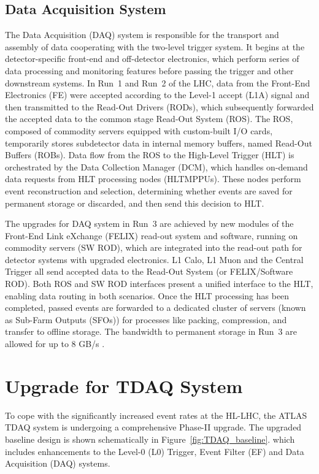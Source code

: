 \subsection{Data Acquisition System}
The Data Acquisition (DAQ) system is responsible for the transport and assembly of data cooperating with the two-level trigger system. It begins at the detector-specific front-end and off-detector electronics, which perform series of data processing and monitoring features before passing the trigger and other downstream systems. In Run~1 and Run~2 of the LHC, data from the Front-End Electronics (FE) were accepted according to the Level-1 accept (L1A) signal and then transmitted to the Read-Out Drivers (RODs), which subsequently forwarded the accepted data to the common stage Read-Out System (ROS). The ROS, composed of commodity servers equipped with custom-built I/O cards, temporarily stores subdetector data in internal memory buffers, named Read-Out Buffers (ROBs). Data flow from the ROS to the High-Level Trigger (HLT) is orchestrated by the Data Collection Manager (DCM), which handles on-demand data requests from HLT processing nodes (HLTMPPUs). These nodes perform event reconstruction and selection, determining whether events are saved for permanent storage or discarded, and then send this decision to HLT. 

The upgrades for DAQ system in Run~3 are achieved by new modules of the Front-End Link eXchange (FELIX) read-out system and software, running on commodity servers (SW ROD), which are integrated into the read-out path for detector systems with upgraded electronics. L1 Calo, L1 Muon and the Central Trigger all send accepted data to the Read-Out System (or FELIX/Software ROD). Both ROS and SW ROD interfaces present a unified interface to the HLT, enabling data routing in both scenarios. Once the HLT processing has been completed, passed events are forwarded to a dedicated cluster of servers (known as Sub-Farm Outputs (SFOs)) for processes like packing, compression, and transfer to offline storage. The bandwidth to permanent storage in Run~3 are allowed for up to 8 GB/s \cite{ATLASRun3Trigger}.

\section{Upgrade for TDAQ System} \label{sec:TDAQUpgrade}
To cope with the significantly increased event rates at the HL-LHC, the ATLAS TDAQ system is undergoing a comprehensive Phase-II upgrade. The upgraded baseline design is shown schematically in Figure~\ref{fig:TDAQ_baseline}. which includes enhancements to the Level-0 (L0) Trigger, Event Filter (EF) and Data Acquisition (DAQ) systems.

